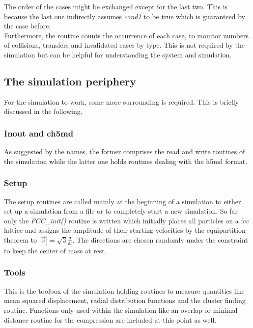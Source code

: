 The order of the cases might be exchanged except for the last two. This is because the last one indirectly assumes \textit{cond1} to be true which is guaranteed by the case before.\\

Furthermore, the routine counts the occurrence of each case, to monitor numbers of collisions, transfers and invalidated cases by type. This is not required by the simulation but can be helpful for understanding the system and simulation.

\subsection{The simulation periphery}
For the simulation to work, some more surrounding is required. This is briefly discussed in the following.
 
\subsubsection{Inout and ch5md}
As suggested by the names, the former comprises the read and write routines of the simulation while the latter one holds routines dealing with the h5md format.

\subsubsection{Setup}
The setup routines are called mainly at the beginning of a simulation to either set up a simulation from a file or to completely start a new simulation. So far only the \textit{FCC\_init()} routine is written which initially places all particles on a fcc lattice and assigns the amplitude of their starting velocities by the equipartition theorem to $|\vec{v}| = \sqrt{3}\frac{\sigma}{\delta t}$. The directions are chosen randomly under the constraint to keep the center of mass at rest.

\subsubsection{Tools}
This is the toolbox of the simulation holding routines to measure quantities like mean squared displacement, radial distribution functions and the cluster finding routine. Functions only used within the simulation like an overlap or minimal distance routine for the compression are included at this point as well.\\

